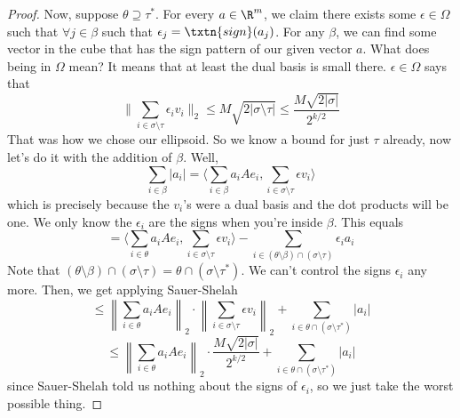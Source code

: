 \begin{proof}
Now, suppose $\theta \supseteq \tau^*$. For every $a \in \R^m$, we claim there exists some $\epsilon \in \Omega$ such that $\forall j \in \beta$ such that $\epsilon_j = \txtn{sign}(a_j)$. For any $\beta$, we can find some vector in the cube that has the sign pattern of our given vector $a$. What does being in $\Omega$ mean? It means that at least the dual basis is small there. $\epsilon \in \Omega$ says that 
\[
\|\sum_{i \in \sigma \setminus \tau} \epsilon_i v_i\|_2 \leq M \sqrt{2|\sigma \setminus \tau|} \leq \frac{M\sqrt{2|\sigma|}}{2^{k/2}}
\]
That was how we chose our ellipsoid. So we know a bound for just $\tau$ already, now let's do it with the addition of $\beta$. Well, 
\[
\sum_{i \in \beta} |a_i| = \langle \sum_{i \in \beta} a_iAe_i, \sum_{i \in \sigma \setminus \tau} \epsilon v_i \rangle
\]
which is precisely because the $v_i$'s were a dual basis and the dot products will be one. We only know the $\epsilon_i$ are the signs when you're inside $\beta$.  This equals 
\[
= \langle \sum_{i \in \theta} a_iAe_i, \sum_{i \in \sigma \setminus \tau} \epsilon v_i \rangle - \sum_{i \in (\theta \setminus \beta)\cap (\sigma \setminus \tau)} \epsilon_ia_i
\]
Note that $(\theta \setminus \beta)\cap (\sigma \setminus \tau) = \theta \cap (\sigma \setminus \tau^*)$. We can't control the signs $\epsilon_i$ any more. Then, we get applying Sauer-Shelah
\[
\leq \left\| \sum_{i \in \theta} a_i Ae_i\right\|_2 \cdot \left\| \sum_{i \in \sigma \setminus \tau} \epsilon v_i \right\|_2 + \sum_{i \in \theta \cap (\sigma \setminus \tau^*)} |a_i|
\]
\[
\leq \left\| \sum_{i \in \theta} a_iAe_i \right\|_2 \cdot \frac{M\sqrt{2|\sigma|}}{2^{k/2}} + \sum_{i \in \theta \cap (\sigma \setminus \tau^*)} |a_i|
\]
since Sauer-Shelah told us nothing about the signs of $\epsilon_i$, so we just take the worst possible thing. 


\end{proof}
